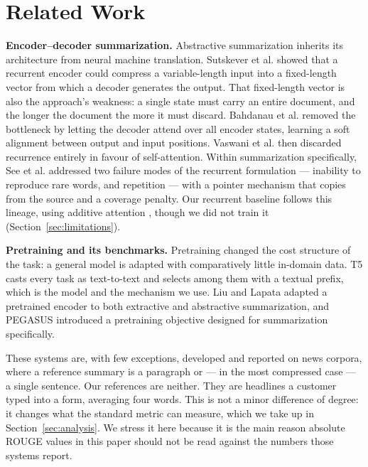 \section{Related Work}
\label{sec:related}

\textbf{Encoder--decoder summarization.} Abstractive summarization inherits its
architecture from neural machine translation. Sutskever et al.
\cite{sutskever2014seq2seq} showed that a recurrent encoder could compress a
variable-length input into a fixed-length vector from which a decoder generates
the output. That fixed-length vector is also the approach's weakness: a single
state must carry an entire document, and the longer the document the more it
must discard. Bahdanau et al. \cite{bahdanau2015attention} removed the
bottleneck by letting the decoder attend over all encoder states, learning a
soft alignment between output and input positions. Vaswani et al.
\cite{vaswani2017attention} then discarded recurrence entirely in favour of
self-attention. Within summarization specifically, See et al.
\cite{see2017pointer} addressed two failure modes of the recurrent formulation
--- inability to reproduce rare words, and repetition --- with a pointer
mechanism that copies from the source and a coverage penalty. Our recurrent
baseline follows this lineage, using additive attention
\cite{bahdanau2015attention}, though we did not train it (Section~\ref{sec:limitations}).

\textbf{Pretraining and its benchmarks.} Pretraining changed the cost structure
of the task: a general model is adapted with comparatively little in-domain
data. T5 \cite{raffel2020t5} casts every task as text-to-text and selects among
them with a textual prefix, which is the model and the mechanism we use. Liu
and Lapata \cite{liu2019bertsum} adapted a pretrained encoder to both
extractive and abstractive summarization, and PEGASUS \cite{zhang2020pegasus}
introduced a pretraining objective designed for summarization specifically.

These systems are, with few exceptions, developed and reported on news
corpora, where a reference summary is a paragraph or --- in the most compressed
case --- a single sentence. Our references are neither. They are headlines a
customer typed into a form, averaging four words. This is not a minor
difference of degree: it changes what the standard metric can measure, which we
take up in Section~\ref{sec:analysis}. We stress it here because it is the main
reason absolute ROUGE values in this paper should not be read against the
numbers those systems report.

